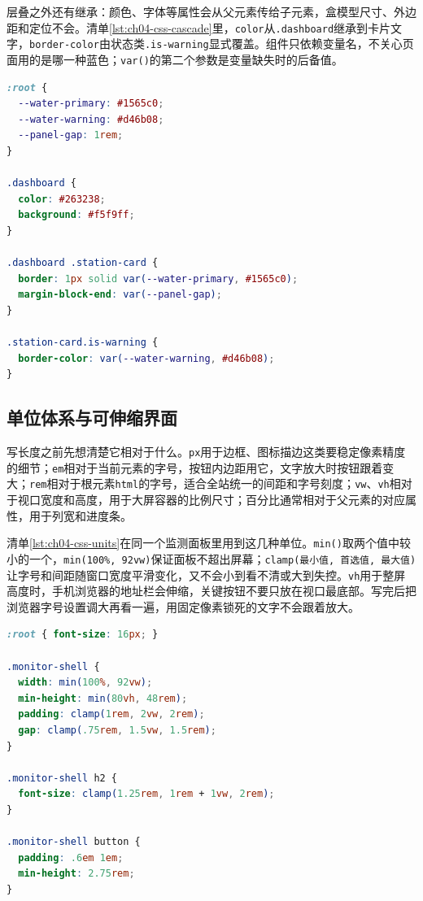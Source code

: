 层叠之外还有继承：颜色、字体等属性会从父元素传给子元素，盒模型尺寸、外边距和定位不会。清单\ref{lst:ch04-css-cascade}里，\texttt{color}从\texttt{.dashboard}继承到卡片文字，\texttt{border-color}由状态类\texttt{.is-warning}显式覆盖。组件只依赖变量名，不关心页面用的是哪一种蓝色；\texttt{var()}的第二个参数是变量缺失时的后备值。

\begin{lstlisting}[label={lst:ch04-css-cascade},language=CSS,caption={主题变量与状态层叠规则}]
:root {
  --water-primary: #1565c0;
  --water-warning: #d46b08;
  --panel-gap: 1rem;
}

.dashboard {
  color: #263238;
  background: #f5f9ff;
}

.dashboard .station-card {
  border: 1px solid var(--water-primary, #1565c0);
  margin-block-end: var(--panel-gap);
}

.station-card.is-warning {
  border-color: var(--water-warning, #d46b08);
}
\end{lstlisting}

\subsection{单位体系与可伸缩界面}

写长度之前先想清楚它相对于什么。\texttt{px}用于边框、图标描边这类要稳定像素精度的细节；\texttt{em}相对于当前元素的字号，按钮内边距用它，文字放大时按钮跟着变大；\texttt{rem}相对于根元素\texttt{html}的字号，适合全站统一的间距和字号刻度；\texttt{vw}、\texttt{vh}相对于视口宽度和高度，用于大屏容器的比例尺寸；百分比通常相对于父元素的对应属性，用于列宽和进度条。

清单\ref{lst:ch04-css-units}在同一个监测面板里用到这几种单位。\texttt{min()}取两个值中较小的一个，\texttt{min(100\%, 92vw)}保证面板不超出屏幕；\texttt{clamp(最小值, 首选值, 最大值)}让字号和间距随窗口宽度平滑变化，又不会小到看不清或大到失控。\texttt{vh}用于整屏高度时，手机浏览器的地址栏会伸缩，关键按钮不要只放在视口最底部。写完后把浏览器字号设置调大再看一遍，用固定像素锁死的文字不会跟着放大。

\begin{lstlisting}[label={lst:ch04-css-units},language=CSS,caption={监测面板的 CSS 单位策略}]
:root { font-size: 16px; }

.monitor-shell {
  width: min(100%, 92vw);
  min-height: min(80vh, 48rem);
  padding: clamp(1rem, 2vw, 2rem);
  gap: clamp(.75rem, 1.5vw, 1.5rem);
}

.monitor-shell h2 {
  font-size: clamp(1.25rem, 1rem + 1vw, 2rem);
}

.monitor-shell button {
  padding: .6em 1em;
  min-height: 2.75rem;
}
\end{lstlisting}


